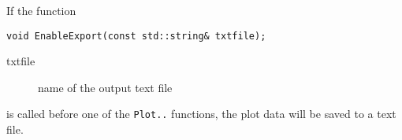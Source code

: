 If the function
\begin{lstlisting}
void EnableExport(const std::string& txtfile);
\end{lstlisting} 
\begin{description}
  \item[txtfile] name of the output text file
\end{description}
is called before one of the \texttt{Plot..} functions, the 
plot data will be saved to a text file.

%
